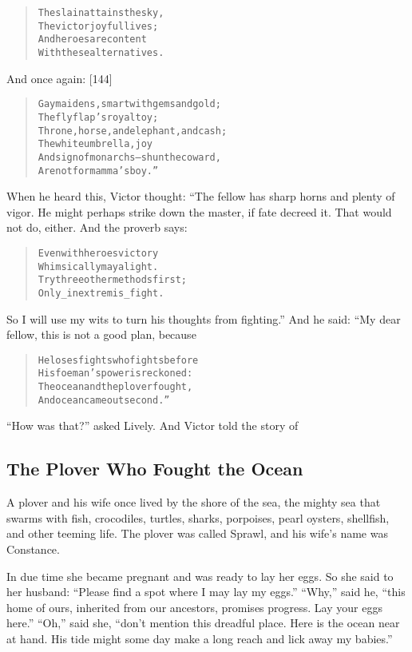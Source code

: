 \documentclass[article, twoside, 14pt]{memoir}
\renewenvironment{verbatim}{%
\begin{quote}%
\vskip -10pt%
\begin{alltt}\normalfont\large}{\end{alltt}%
\end{quote}%
\vskip -10pt
} %
\begin{document}
\begin{verbatim}
The slain attains the sky,
    The victor joyful lives;
And heroes are content
    With these alternatives.
\end{verbatim}
And once again: [144]

\begin{verbatim}
Gay maidens, smart with gems and gold;
    The flyflap's royal toy;
Throne, horse, and elephant, and cash;
    The white umbrella, joy
And sign of monarchs--shun the coward,
    Are not for mamma's boy.”
\end{verbatim}
When he heard this, Victor thought: “The fellow has sharp horns and
plenty of vigor. He might perhaps strike down the master, if fate
decreed it. That would not do, either. And the proverb says:

\begin{verbatim}
Even with heroes victory
    Whimsically may alight.
Try three other methods first;
    Only _in extremis_ fight.
\end{verbatim}
So I will use my wits to turn his thoughts from fighting.” And he
said: “My dear fellow, this is not a good plan, because

\begin{verbatim}
He loses fights who fights before
    His foeman's power is reckoned:
The ocean and the plover fought,
    And ocean came out second.”
\end{verbatim}
``How was that?'' asked Lively. And Victor told the story of

\subsection{The Plover Who Fought the Ocean}

\label{s18}

A plover and his wife once lived by the shore of the sea, the
mighty sea that swarms with fish, crocodiles, turtles, sharks,
porpoises, pearl oysters, shellfish, and other teeming life. The
plover was called Sprawl, and his wife's name was Constance.

In due time she became pregnant and was ready to lay her eggs. So
she said to her husband:
``Please find a spot where I may lay my eggs.'' ``Why,'' said he,
``this home of ours, inherited from our ancestors, promises progress. Lay your eggs here.''
``Oh,'' said she,
``don't mention this dreadful place. Here is the ocean near at hand. His tide might some day make a long reach and lick away my babies.''
\end{document}
